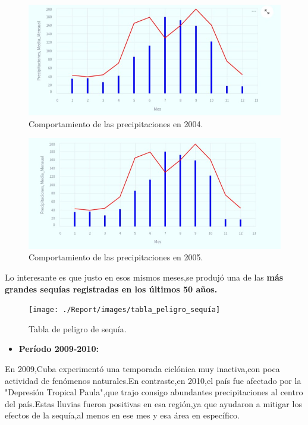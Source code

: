 \documentclass[12pt]{article}
\begin{document}
	
	\begin{figure}[H]
		\centering
		\includegraphics[width=0.7\linewidth]{./Report/images/precipitaciones_2004}
		\caption{Comportamiento de las precipitaciones en 2004.}
		\label{fig:precipitaciones2004}
	\end{figure}
	
	
	\begin{figure}[H]
		\centering
		\includegraphics[width=0.7\linewidth]{./Report/images/precipitaciones_2005}
		\caption{Comportamiento de las precipitaciones en 2005.}
		\label{fig:precipitaciones2005}
	\end{figure}
	
	
	Lo interesante es que justo en esos mismos meses,se produjó una de las\textbf{ más grandes sequías registradas en los últimos 50 años.}\cite{webpage5}
	
	
	\begin{figure}[H]
		\centering
		\texttt{[image: ./Report/images/tabla\_peligro\_sequía]}
		\caption{Tabla de peligro de sequía.}
		\label{fig:tablapeligrosequia}
	\end{figure}
	
	\begin{itemize}
		\item\textbf{Período 2009-2010:}
	\end{itemize}
	
	
	En 2009,Cuba experimentó una temporada ciclónica muy inactiva,con poca actividad de fenómenos naturales.En contraste,en 2010,el país fue afectado por la "Depresión Tropical Paula",que trajo consigo abundantes precipitaciones al centro del país.Estas lluvias fueron positivas en esa región,ya que ayudaron a mitigar los efectos de la sequía,al menos en ese mes y esa área en específico.\cite{webpage6}\cite{webpage7}
	
\end{document}
